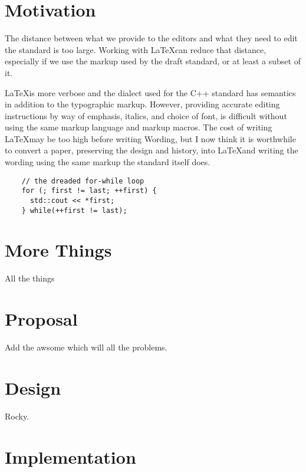 \documentclass[a4paper,10pt,oneside,openany,final,article]{memoir}
\begin{document}
\chapter{Motivation}

The distance between what we provide to the editors and what they need to edit the standard is too large. Working with \LaTeX\space can reduce that distance, especially if we use the markup used by the draft standard, or at least a subset of it.

\LaTeX\space is more verbose and the dialect used for the C++ standard has semantics in addition to the typographic markup. However, providing accurate editing instructions by way of emphasis, italics, and choice of font, is difficult without using the same markup language and markup macros. The cost of writing \LaTeX\space may be too high before writing Wording, but I now think it is worthwhile to convert a paper, preserving the design and history, into \LaTeX\space and writing the wording using the same markup the standard itself does.


\begin{minipage}[t]{0.45\columnwidth}
  \begin{verbatim}
    // the dreaded for-while loop
    for (; first != last; ++first) {
      std::cout << *first;
    } while(++first != last);

  \end{verbatim}
\end{minipage}




\chapter{More Things}

All the things

\chapter{Proposal}

Add the awsome  which will  all the problems.


\chapter{Design}

Rocky.

\chapter{Implementation}
\end{document}
